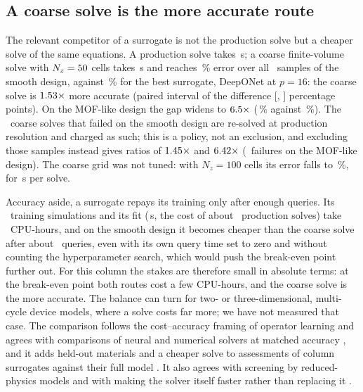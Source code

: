 \documentclass[10pt,a4paper]{article}
\begin{document}
\subsection{A coarse solve is the more accurate route}
\label{sec:cost}

The relevant competitor of a surrogate is not the production solve but a cheaper solve of
the same equations. A production solve takes \nCostProdS\,s; a coarse finite-volume solve
with \(N_z = 50\) cells takes \nCostCoarseS\,s and reaches \nScrCoNr\,\% error over
all \nScrNsamples\ samples of the smooth design, against \nScrDonNr\,\% for the best
surrogate, DeepONet at \(p = 16\): the coarse solve is \(1.53\times\) more accurate
(paired interval of the difference [\nScrDonMinusCoLo, \nScrDonMinusCoHi] percentage
points). On the MOF-like design the gap widens to \(6.5\times\)
(\nScrVthreeCoNr\,\% against \nScrVthreeDonNr\,\%). The \nCoFailVtwo\ coarse solves that
failed on the smooth design are re-solved at production resolution and charged as such; this is a policy, not an
exclusion, and excluding those samples instead gives ratios of \(1.45\times\) and
\(6.42\times\) (\nCoFailVthree\ failures on the MOF-like design). The
coarse grid was not tuned: with \(N_z = 100\) cells its error falls to
\nCostCoarseHundredErr\,\%, for \nCostCoarseHundredS\,s per solve.

Accuracy aside, a surrogate repays its training only after enough queries. Its
\nCostLargeSims\ training simulations and its fit (\nCostFitS\,s, the cost of about
\nCostFitSolves\ production solves) take \nCostTrainCpuH\ CPU-hours, and on the smooth design
it becomes cheaper than the coarse solve after about \nCostBeFit\ queries, even with its own
query time set to zero and without counting the hyperparameter search, which would push the
break-even point further out. For this column the stakes are therefore small in absolute terms:
at the break-even point both routes cost a few CPU-hours, and the coarse solve is the more
accurate. The balance can turn for two- or
three-dimensional, multi-cycle device models, where a solve costs far more; we have not
measured that case. The comparison follows the cost--accuracy framing of operator learning
\cite{dehoop2022cost} and agrees with comparisons of neural and numerical solvers at
matched accuracy \cite{huang2026cost}, and it adds held-out materials and a cheaper solve to
assessments of column surrogates against their full model \cite{michalopoulou2024assessment}. It
also agrees with screening by reduced-physics models \cite{liske2026extended,grimm2022machine} and
with making the solver itself faster rather than replacing it
\cite{glover2026accelerating,zhang2024blending}.
\end{document}

